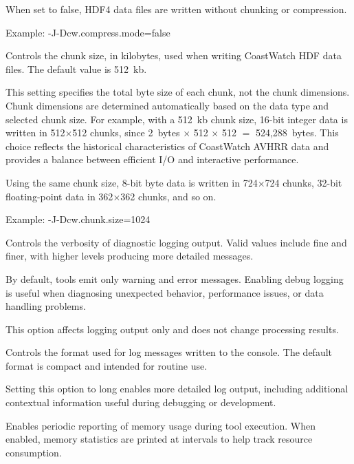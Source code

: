 \begin{description}[style=nextline]
When set to {\file false}, HDF4 data files are written without chunking or
compression.

Example: {\file -J-Dcw.compress.mode=false}

\item[{\file -J-Dcw.chunk.size=SIZE}] 

Controls the chunk size, in kilobytes, used when writing CoastWatch HDF data
files. The default value is 512~kb.

This setting specifies the total byte size of each chunk, not the chunk
dimensions. Chunk dimensions are determined automatically based on the data
type and selected chunk size. For example, with a 512~kb chunk size, 16-bit
integer data is written in 512$\times$512 chunks, since
2~bytes $\times$ 512 $\times$ 512 $=$ 524{,}288~bytes. This choice reflects the
historical characteristics of CoastWatch AVHRR data and provides a balance
between efficient I/O and interactive performance.

Using the same chunk size, 8-bit byte data is written in
724$\times$724 chunks, 32-bit floating-point data in 362$\times$362 chunks, and
so on.

Example: {\file -J-Dcw.chunk.size=1024}

\item[{\file -J-Dcw.debug=LEVEL}] 

Controls the verbosity of diagnostic logging output. Valid values
include {\file fine} and {\file finer}, with higher levels producing more
detailed messages.

By default, tools emit only warning and error messages. Enabling debug logging
is useful when diagnosing unexpected behavior, performance issues, or data
handling problems.

This option affects logging output only and does not change processing results.

\item[{\file -J-Dcw.log.format=FORMAT}] 

Controls the format used for log messages written to the console. The default
format is compact and intended for routine use.

Setting this option to {\file long} enables more detailed log output, including
additional contextual information useful during debugging or development.

\item[{\file -J-Dcw.memory.monitor=true}] 

Enables periodic reporting of memory usage during tool execution. When enabled,
memory statistics are printed at intervals to help track resource consumption.


\end{description}
